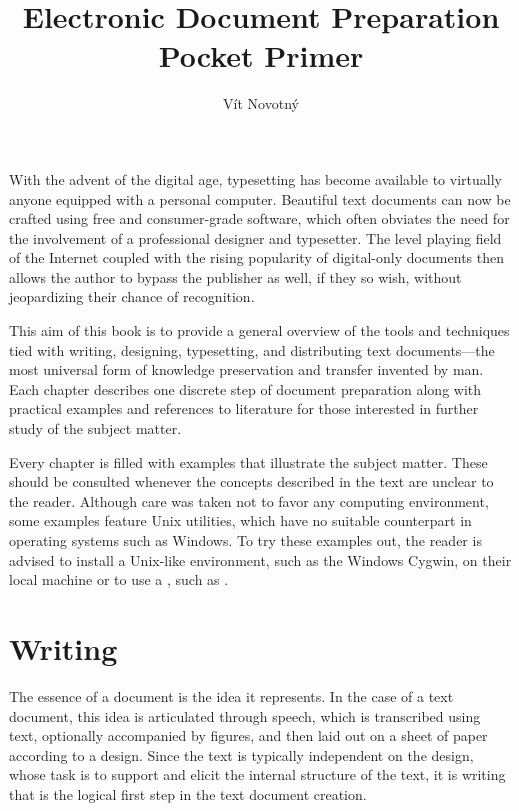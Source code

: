 \documentclass[
  a5paper,10pt,           %
  dvipsnames              %
]{book}
\begin{document}
\frontmatter
\title{Electronic Document Preparation\\Pocket Primer}
\author{Vít Novotný}
\maketitle
\tableofcontents
\mainmatter
{}
With the advent of the digital age, typesetting has become available to
virtually anyone equipped with a personal computer. Beautiful text documents can
now be crafted using free and consumer-grade software, which often obviates the
need for the involvement of a professional designer and typesetter. The level
playing field of the Internet coupled with the rising popularity of digital-only
documents then allows the author to bypass the publisher as well, if they so
wish, without jeopardizing their chance of recognition.

This aim of this book is to provide a general overview of the tools and
techniques tied with writing, designing, typesetting, and distributing text
documents---the most universal form of knowledge preservation and transfer
invented by man. Each chapter describes one discrete step of document
preparation along with practical examples and references to literature for those
interested in further study of the subject matter.

Every chapter is filled with examples that illustrate the subject matter. These
should be consulted whenever the concepts described in the text are unclear to
the reader. Although care was taken not to favor any computing environment,
some examples feature Unix utilities, which have no suitable counterpart in
operating systems such as Windows. To try these examples out, the reader is
advised to install a Unix-like environment, such as the Windows Cygwin, on their
local machine or to use a \Unix, such as \Linux.

\chapter{Writing}
The essence of a document is the idea it represents. In the case of a text
document, this idea is articulated through speech, which is transcribed using
text, optionally accompanied by figures, and then laid out on a sheet of paper
according to a design. Since the text is typically independent on the design,
whose task is to support and elicit the internal structure of the text, it is
writing that is the logical first step in the text document creation.
\end{document}
